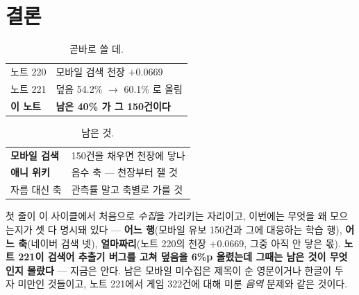 \documentclass[10pt]{article}
\begin{document}

\section{결론}


\begin{table}[t]
\centering\tsize
\caption{곧바로 쓸 데.}
\begin{tabular}{ll}
\toprule
노트 220 & 모바일 검색 천장 $+$0.0669 \\
노트 221 & 덮음 54.2\% $\to$ 60.1\% 로 올림 \\
\textbf{이 노트} & \textbf{남은 40\% 가 그 150건이다} \\
\bottomrule
\end{tabular}
\end{table}

\begin{table}[t]
\centering\tsize
\caption{남은 것.}
\begin{tabular}{ll}
\toprule
\textbf{모바일 검색} & 150건을 채우면 천장에 닿나 \\
\textbf{애니 위키} & 음수 축 --- 천장부터 잴 것 \\
자름 대신 축 & 관측률 말고 축별로 가를 것 \\
\bottomrule
\end{tabular}
\end{table}

첫 줄이 이 사이클에서 처음으로 \emph{수집}을 가리키는 자리이고, 이번에는
무엇을 왜 모으는지가 셋 다 명시돼 있다 --- \textbf{어느 행}(모바일 유보
150건과 그에 대응하는 학습 행), \textbf{어느 축}(네이버 검색 넷),
\textbf{얼마짜리}(노트 220의 천장 $+$0.0669, 그중 아직 안 닿은 몫).
\textbf{노트 221이 검색어 추출기 버그를 고쳐 덮음을 6\%p 올렸는데 그때는
남은 것이 무엇인지 몰랐다} --- 지금은 안다. 남은 모바일 미수집은 제목이
순 영문이거나 한글이 두 자 미만인 것들이고, 노트 221에서 게임 322건에
대해 미룬 \emph{음역} 문제와 같은 것이다.
\end{document}
